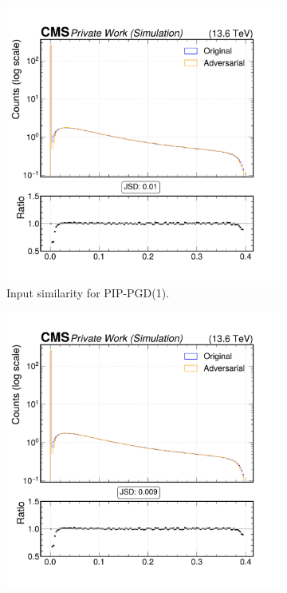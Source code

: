 \begin{figure}[htbp]
  \centering
  \begin{subfigure}[t]{0.32\textwidth}
    \includegraphics[width=\linewidth]{media/output/features/compare/combined_it_1/cmp_cpf_arr_Cpfcan_BtagPf_trackDeltaR.pdf}
    \caption*{Input similarity for PIP-PGD(1).}
  \end{subfigure}\hfill
  \begin{subfigure}[t]{0.32\textwidth}
    \includegraphics[width=\linewidth]{media/output/features/compare/combined_it_2/cmp_cpf_arr_Cpfcan_BtagPf_trackDeltaR.pdf}

\end{subfigure}
\end{figure}
